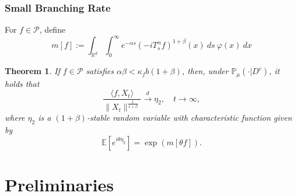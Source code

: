 \documentclass[12pt]{amsart}
\theoremstyle{plain}
\newtheorem{thm}{Theorem}[section]
\theoremstyle{definition}
\numberwithin{equation}{section}
\begin{document}
\subsubsection{Small Branching Rate}

For $f\in \mathcal{P}$, define
$$m[f]:=\int_{\mathbb{R}^d}\int_0^{\infty} e^{-\alpha s}(-iT_{s}^{\alpha}f)^{1+\beta}(x)~ds~\varphi(x)~dx$$
\begin{thm}\label{Theorem13}
    If $f\in\mathcal{P}$ satisfies  $\alpha\beta<\kappa_f b(1+\beta)$, then, under $\mathbb{P}_{\mu}(\cdot|D^c)$, it holds that
    $$\frac{\langle f,X_t\rangle}{\|X_t\|^{\frac{1}{1+\beta}}}\xrightarrow{d} \eta_2, \quad t\rightarrow \infty,$$
    where $\eta_2$ is a $(1+\beta)$-stable random variable with characteristic function given by
    $$\mathbb{E} [e^{i\theta \eta_2}]=\exp(m[\theta f]).$$
\end{thm}

\section{Preliminaries}
\begin{comment}

\deleted{	
	In this case we have
\begin{align}
    I_a^b[\langle g,X_t\rangle]
    = I_a^b\big[\mathbb P[\langle g,X_t\rangle|\mathscr F_b]\big]
    = I_a^b[ \langle T_{t-b}^\alpha g, X_b \rangle ].
\end{align}
}
\end{comment}
\end{document}
